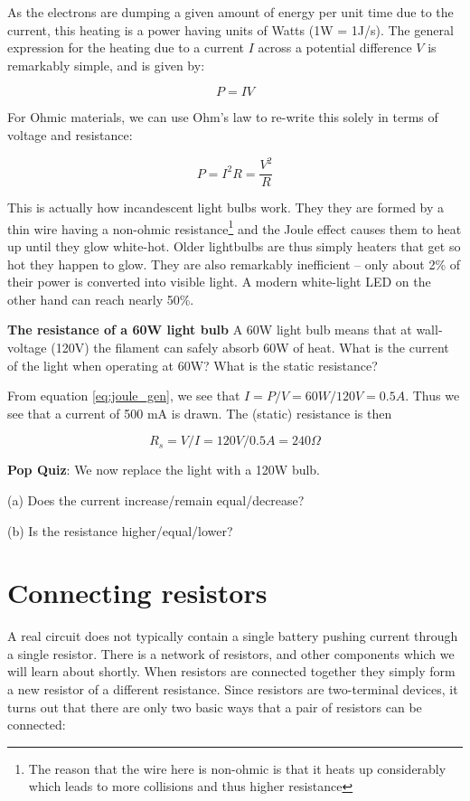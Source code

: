 \documentclass{tufte-book}
\begin{document}
As the electrons are dumping a given amount of energy per unit time due to the current, this heating is a power having units of Watts (1W = 1J/s). The general expression for the heating due to a current $I$ across a potential difference $V$ is remarkably simple, and is given by:

\begin{equation}\label{eq:joule_gen}
\boxed{P=IV}
\end{equation}

For Ohmic materials, we can use Ohm's law to re-write this solely in terms of voltage and resistance:

\begin{equation}\label{eq:joule_ohm}
P = I^2R = \frac{V^2}{R}
\end{equation}

This is actually how incandescent light bulbs work. They they are formed by a thin wire having a non-ohmic resistance\footnote{The reason that the wire here is non-ohmic is that it heats up considerably which leads to more collisions and thus higher resistance} and the Joule effect causes them to heat up until they glow white-hot. Older lightbulbs are thus simply heaters that get so hot they happen to glow. They are also remarkably inefficient -- only about 2\% of their power is converted into visible light. A modern white-light LED on the other hand can reach nearly 50\%.


\textbf{The resistance of a 60W light bulb}
A 60W light bulb means that at wall-voltage (120V) the filament can safely absorb 60W of heat. What is the current of the light when operating at 60W? What is the static resistance?

\noindent From equation \ref{eq:joule_gen}, we see that $I = P/V = 60W/120V = 0.5A$. Thus we see that a current of 500 mA is drawn. The (static) resistance is then 

$$
R_s = V/I = 120V/0.5A = 240 \Omega
$$

\noindent\textbf{Pop Quiz}: We now replace the light with a 120W bulb.

\noindent(a) Does the current increase/remain equal/decrease? 

\noindent(b) Is the resistance higher/equal/lower? 


\section{Connecting resistors}
A real circuit does not typically contain a single battery pushing current through a single resistor. There is a network of resistors, and other components which we will learn about shortly. When resistors are connected together they simply form a new resistor of a different resistance. Since resistors are two-terminal devices, it turns out that there are only two basic ways that a pair of resistors can be connected:
\end{document}
